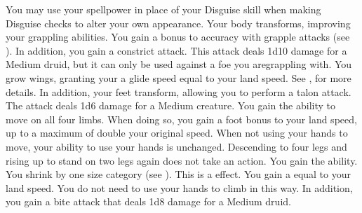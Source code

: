             You may use your spellpower in place of your Disguise skill when making Disguise checks to alter your own appearance.
            Your body transforms, improving your grappling abilities.
            You gain a  bonus to accuracy with grapple attacks (see ).
            In addition, you gain a constrict attack.
            This attack deals 1d10 damage for a Medium druid, but it can only be used against a foe you aregrappling with.
            You grow wings, granting your a glide speed equal to your land speed.
            See , for more details.
            In addition, your feet transform, allowing you to perform a talon attack.
            The attack deals 1d6 damage for a Medium creature.
            You gain the ability to move on all four limbs.
            When doing so, you gain a  foot bonus to your land speed, up to a maximum of double your original speed.
            When not using your hands to move, your ability to use your hands is unchanged.
            Descending to four legs and rising up to stand on two legs again does not take an action.
            You gain the  ability.
            You shrink by one size category (see ).
            This is a  effect.
            You gain a  equal to your land speed.
            You do not need to use your hands to climb in this way.
            In addition, you gain a bite attack that deals 1d8 damage for a Medium druid.



